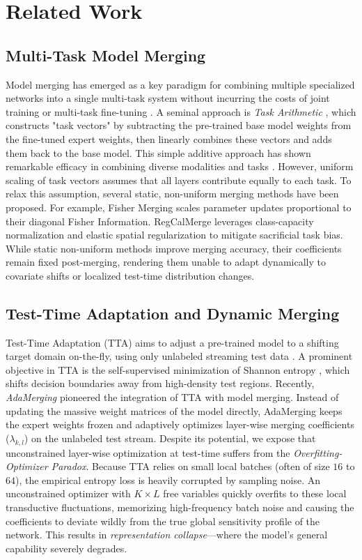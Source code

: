 \section{Related Work}
\label{sec:related}

\subsection{Multi-Task Model Merging}
Model merging has emerged as a key paradigm for combining multiple specialized networks into a single multi-task system without incurring the costs of joint training or multi-task fine-tuning \cite{choshen2022fusing}. A seminal approach is \emph{Task Arithmetic} \cite{ilharco2022editing}, which constructs "task vectors" by subtracting the pre-trained base model weights from the fine-tuned expert weights, then linearly combines these vectors and adds them back to the base model. This simple additive approach has shown remarkable efficacy in combining diverse modalities and tasks \cite{wortsman2022robust}. 
However, uniform scaling of task vectors assumes that all layers contribute equally to each task. To relax this assumption, several static, non-uniform merging methods have been proposed. For example, Fisher Merging \cite{matena2022merging} scales parameter updates proportional to their diagonal Fisher Information. RegCalMerge \cite{regcalmerge2026} leverages class-capacity normalization and elastic spatial regularization to mitigate sacrificial task bias. While static non-uniform methods improve merging accuracy, their coefficients remain fixed post-merging, rendering them unable to adapt dynamically to covariate shifts or localized test-time distribution changes.

\subsection{Test-Time Adaptation and Dynamic Merging}
Test-Time Adaptation (TTA) aims to adjust a pre-trained model to a shifting target domain on-the-fly, using only unlabeled streaming test data \cite{wang2020tent, liang2023comprehensive}. A prominent objective in TTA is the self-supervised minimization of Shannon entropy \cite{wang2020tent}, which shifts decision boundaries away from high-density test regions. Recently, \emph{AdaMerging} \cite{lu2023adamerging} pioneered the integration of TTA with model merging. Instead of updating the massive weight matrices of the model directly, AdaMerging keeps the expert weights frozen and adaptively optimizes layer-wise merging coefficients ($\lambda_{k, l}$) on the unlabeled test stream.
Despite its potential, we expose that unconstrained layer-wise optimization at test-time suffers from the \emph{Overfitting-Optimizer Paradox}. Because TTA relies on small local batches (often of size $16$ to $64$), the empirical entropy loss is heavily corrupted by sampling noise. An unconstrained optimizer with $K \times L$ free variables quickly overfits to these local transductive fluctuations, memorizing high-frequency batch noise and causing the coefficients to deviate wildly from the true global sensitivity profile of the network. This results in \emph{representation collapse}---where the model's general capability severely degrades. 

